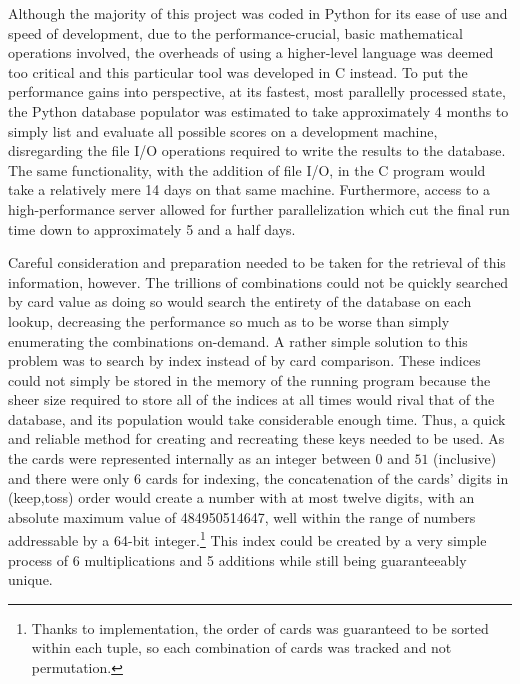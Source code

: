 Although the majority of this project was coded in Python for its ease of use
and speed of development,
due to the performance-crucial, basic mathematical operations involved,
the overheads of using a higher-level language was deemed too critical and
this particular tool was developed in C instead.
%
To put the performance gains into perspective,
at its fastest, most parallelly processed state,
the Python database populator was estimated to take approximately 4 months to
simply list and evaluate all possible scores on a development machine,
disregarding the file I/O operations required to write the results to the
database.
%
The same functionality, with the addition of file I/O,
in the C program would take a relatively mere 14 days
on that same machine.
%
Furthermore, access to a high-performance server allowed for further
parallelization which cut the final run time down to approximately 5 and a half
days.

Careful consideration and preparation needed to be taken
for the retrieval of this information, however.
%
The trillions of combinations could not be quickly searched by card value as
doing so would search the entirety of the database on each lookup,
decreasing the performance so much as to be worse than simply
enumerating the combinations on-demand.
%
A rather simple solution to this problem was to search by index
instead of by card comparison.
%
These indices could not simply be stored in the memory of the running program
because the sheer size required to store all of the indices at all times
would rival that of the database,
and its population would take considerable enough time.
%
Thus, a quick and reliable method for creating and recreating these keys
needed to be used.
%
As the cards were represented internally as an integer between $0$ and $51$
(inclusive)
and there were only 6 cards for indexing,
the concatenation of the cards' digits in (keep,toss) order
would create a number with at most twelve digits,
with an absolute maximum value of 484950514647,
well within the range of numbers addressable by a 64-bit integer.\footnote{
	Thanks to implementation,
	the order of cards was guaranteed to be sorted within each tuple,
	so each combination of cards was tracked and not permutation.
}
%
This index could be created by a very simple process of 6 multiplications and
5 additions
while still being guaranteeably unique.




